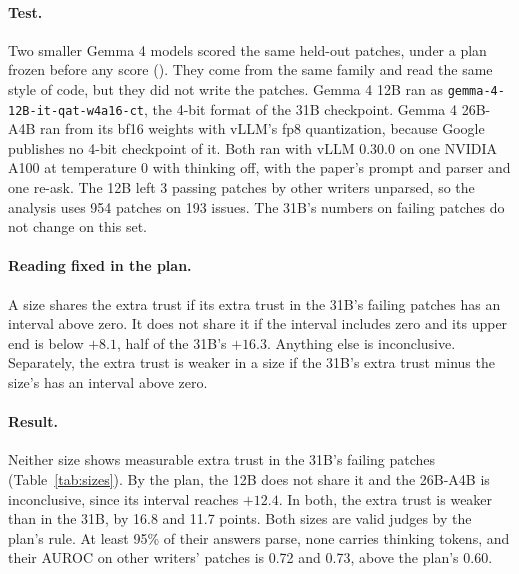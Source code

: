 \documentclass[10pt,letterpaper]{article}
\begin{document}
\paragraph{Test.} Two smaller Gemma 4 models scored the same held-out patches, under a plan frozen before any score
(). They come from the same family and read the same style of code, but they did not
write the patches. Gemma 4 12B ran as \texttt{gemma-4-12B-it-qat-w4a16-ct}, the 4-bit format of the 31B checkpoint.
Gemma 4 26B-A4B ran from its bf16 weights with vLLM's fp8 quantization, because Google publishes no 4-bit checkpoint
of it. Both ran with vLLM 0.30.0 on one NVIDIA A100 at temperature 0 with thinking off, with the paper's prompt and
parser and one re-ask. The 12B left 3 passing patches by other writers unparsed, so the analysis uses 954 patches
on 193 issues. The 31B's numbers on failing patches do not change on this set.

\paragraph{Reading fixed in the plan.} A size shares the extra trust if its extra trust in the 31B's failing
patches has an interval above zero. It does not share it if the interval includes zero and its upper end is below
$+8.1$, half of the 31B's $+16.3$. Anything else is inconclusive. Separately, the extra trust is weaker in a size if
the 31B's extra trust minus the size's has an interval above zero.

\paragraph{Result.} Neither size shows measurable extra trust in the 31B's failing patches (Table~\ref{tab:sizes}).
By the plan, the 12B does not share it and the 26B-A4B is inconclusive, since its interval reaches $+12.4$. In both, the
extra trust is weaker than in the 31B, by 16.8 and 11.7 points. Both sizes are valid judges by the plan's rule. At
least 95\% of their answers parse, none carries thinking tokens, and their AUROC on other writers' patches is 0.72
and 0.73, above the plan's 0.60.
\end{document}
